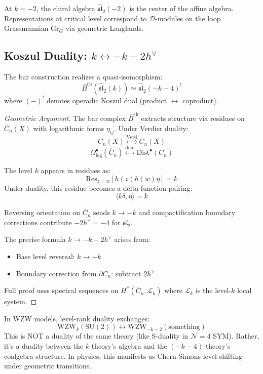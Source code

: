 \begin{corollary}
At $k = -2$, the chiral algebra $\widehat{\mathfrak{sl}}_2(-2)$ is the center of the affine algebra. Representations at critical level correspond to $\mathcal{D}$-modules on the loop Grassmannian $\text{Gr}_{G}$ via geometric Langlands.
\end{corollary}

\subsection{Koszul Duality: $k \leftrightarrow -k-2h^\vee$}

\begin{theorem}
\label{thm:sl2-koszul-level}
The bar construction realizes a quasi-isomorphism:
$$\bar{B}^{\text{ch}}(\widehat{\mathfrak{sl}}_2(k)) \simeq \widehat{\mathfrak{sl}}_2(-k-4)^! $$
where $(-)^!$ denotes operadic Koszul dual (product $\leftrightarrow$ coproduct).
\end{theorem}

\begin{proof}[Geometric Argument]
The bar complex $\bar{B}^{\text{ch}}$ extracts structure via residues on $\overline{C}_n(X)$ with logarithmic forms $\eta_{ij}$. Under Verdier duality:
$$\overline{C}_n(X) \overset{\text{Verd}}{\longleftrightarrow} C_n(X)$$
$$\Omega^{\bullet}_{\log}(\overline{C}_n) \overset{\text{dual}}{\longleftrightarrow} \text{Dist}^{\bullet}(C_n)$$

The level $k$ appears in residues as:
$$\text{Res}_{z=w}[h(z)h(w) \eta] = k$$
Under duality, this residue becomes a delta-function pairing:
$$\langle k \delta, \eta \rangle = k$$

Reversing orientation on $\overline{C}_n$ sends $k \to -k$ and compactification boundary corrections contribute $-2h^\vee = -4$ for $\mathfrak{sl}_2$.

The precise formula $k \to -k-2h^\vee$ arises from:
\begin{itemize}
\item Base level reversal: $k \to -k$
\item Boundary correction from $\partial\overline{C}_n$: subtract $2h^\vee$
\end{itemize}
Full proof uses spectral sequences on $H^*(\overline{C}_n, \mathcal{L}_k)$ where $\mathcal{L}_k$ is the level-$k$ local system.
\end{proof}

\begin{remark}
In WZW models, level-rank duality exchanges:
$$\text{WZW}_{k}(\text{SU}(2)) \leftrightarrow \text{WZW}_{-k-2}(\text{something})$$
This is NOT a duality of the same theory (like S-duality in $\mathcal{N}=4$ SYM). Rather, it's a duality between the $k$-theory's algebra and the $(-k-4)$-theory's coalgebra structure. In physics, this manifests as Chern-Simons level shifting under geometric transitions.
\end{remark}

